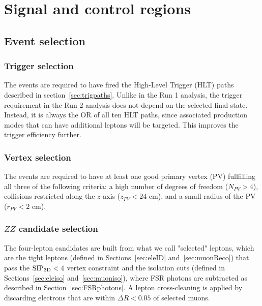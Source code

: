 \chapter{Signal and control regions}

\section{Event selection}

\subsection{Trigger selection}
\label{sec:HLTsel}

The events are required to have fired the High-Level Trigger (HLT) paths described in section~\ref{sec:trigpaths}. Unlike in the Run 1 analysis, the trigger requirement in the Run 2 analysis does not depend on the selected final state. Instead, it is always the OR of all ten HLT paths, since associated production modes that can have additional leptons will be targeted. This improves the trigger efficiency further.

\subsection{Vertex selection}
\label{sec:vertexsel}

The events are required to have at least one good primary
vertex (PV) fullfilling all three of the following criteria: a high number of degrees
of freedom ($N_{PV}>4$), collisions restricted along the $z$-axis
($z_{PV}<24$ cm), and a small radius of the PV ($r_{PV}<2$ cm).


\subsection{$ZZ$ candidate selection}
\label{sec:zzcandsel}

The four-lepton candidates are built from what we call "selected" leptons, which  
are the tight leptons (defined in Sections~\ref{sec:eleID} and~\ref{sec:muonReco}) that pass the ${\rm SIP_{3D}} < 4$ vertex constraint
and the isolation cuts (defined in Sections~\ref{sec:eleiso} and~\ref{sec:muoniso}), 
where FSR photons are subtracted as described in Section~\ref{sec:FSRphotons}.
A lepton cross-cleaning is applied 
by discarding electrons that are within $\Delta R < 0.05$ of selected muons. 


